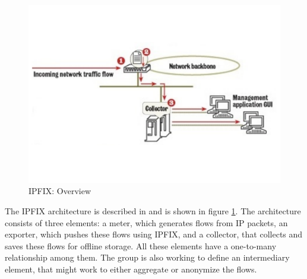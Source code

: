 \begin{figure}[h!]
\begin{center}
  \includegraphics* [width=0.7\linewidth]{figures/ipfix-overview}	
  \caption{IPFIX: Overview \cite{pkohler:2003}}
  \label{fig:ipfix-overview}
\end{center}
\end{figure}
The \ac{IPFIX} architecture is described in \cite{rfc5470} and is shown in figure \ref{fig:ipfix-overview}. The architecture consists of three elements: a meter, which generates flows from \ac{IP} packets, an exporter, which pushes these flows using \ac{IPFIX}, and  a collector, that collects and saves these flows for offline storage. All these elements have a one-to-many relationship among them. The group is also working to define an intermediary element, that might work to either aggregate or anonymize the flows. 

